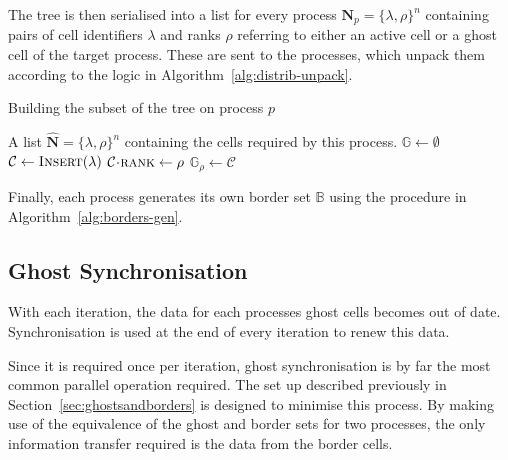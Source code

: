\documentclass[twoside]{IIBproject}
\newcommand{\vect} [1] {\bm{#1}}
\newcommand{\acc}{{\mkern 0.5mu\cdot\mkern 0.5mu}}
\numberwithin{figure}{section}
\begin{document}
        The tree is then serialised into a list for every process $\vect{N}_p=\{\lambda,\rho\}^n$ containing pairs of cell identifiers $\lambda$ and ranks $\rho$ referring to either an active cell or a ghost cell of the target process. These are sent to the processes, which unpack them according to the logic in Algorithm~\ref{alg:distrib-unpack}.

        \begin{algorithm}[H]
            \caption{Building the subset of the tree on process $p$}
            \label{alg:distrib-unpack}

            \begin{algorithmic}
                \Require A list $\vect{\hat N}=\{\lambda,\rho\}^n$ containing the cells required by this process.
                \Statex
                \State $\mathbb{G} \gets \emptyset$ 
                \ForEach {packed cell $\{\lambda,\rho\} \in \vect{\hat N}$}
                    \State $\mathcal{C} \gets \textproc{Insert}(\lambda)$ 
                    \State $\mathcal{C}\acc\textproc{rank} \gets \rho$
                     
                        \State $\mathbb{G}_\rho \gets \mathcal{C}$
                    \EndIf
                \EndFor
            \end{algorithmic}
        \end{algorithm}

        Finally, each process generates its own border set $\mathbb{B}$ using the procedure in Algorithm~\ref{alg:borders-gen}.



    \subsection{Ghost Synchronisation} %
        \label{sec:ghostsync}

        With each iteration, the data for each processes ghost cells becomes out of date. Synchronisation is used at the end of every iteration to renew this data.

        Since it is required once per iteration, ghost synchronisation is by far the most common parallel operation required. The set up described previously in Section~\ref{sec:ghostsandborders} is designed to minimise this process. By making use of the equivalence of the ghost and border sets for two processes, the only information transfer required is the data from the border cells.
\end{document}
